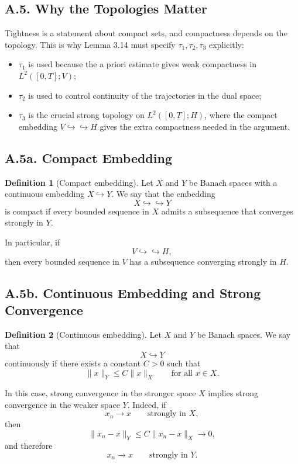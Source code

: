 \documentclass[11pt]{article}
\theoremstyle{definition}
\newtheorem{definition}{Definition}
\theoremstyle{remark}
\begin{document}
\subsection*{A.5. Why the Topologies Matter}
Tightness is a statement about compact sets, and compactness depends on the topology. This is why Lemma 3.14 must specify $\tau_1,\tau_2,\tau_3$ explicitly:
\begin{itemize}
\item $\tau_1$ is used because the a priori estimate gives weak compactness in $L^2([0,T];V)$;
\item $\tau_2$ is used to control continuity of the trajectories in the dual space;
\item $\tau_3$ is the crucial strong topology on $L^2([0,T];H)$, where the compact embedding $V\hookrightarrow\hookrightarrow H$ gives the extra compactness needed in the argument.
\end{itemize}

\subsection*{A.5a. Compact Embedding}
\begin{definition}[Compact embedding]
Let $X$ and $Y$ be Banach spaces with a continuous embedding $X\hookrightarrow Y$. We say that the embedding
\[
  X\hookrightarrow\hookrightarrow Y
\]
is compact if every bounded sequence in $X$ admits a subsequence that converges strongly in $Y$.
\end{definition}

In particular, if
\[
  V\hookrightarrow\hookrightarrow H,
\]
then every bounded sequence in $V$ has a subsequence converging strongly in $H$.

\subsection*{A.5b. Continuous Embedding and Strong Convergence}
\begin{definition}[Continuous embedding]
Let $X$ and $Y$ be Banach spaces. We say that
\[
  X\hookrightarrow Y
\]
continuously if there exists a constant $C>0$ such that
\[
  \|x\|_Y\le C\|x\|_X
  \qquad \text{for all } x\in X.
\]
\end{definition}

In this case, strong convergence in the stronger space $X$ implies strong convergence in the weaker space $Y$. Indeed, if
\[
  x_n\to x
  \qquad \text{strongly in } X,
\]
then
\[
  \|x_n-x\|_Y
  \le
  C\|x_n-x\|_X\to 0,
\]
and therefore
\[
  x_n\to x
  \qquad \text{strongly in } Y.
\]
\end{document}
